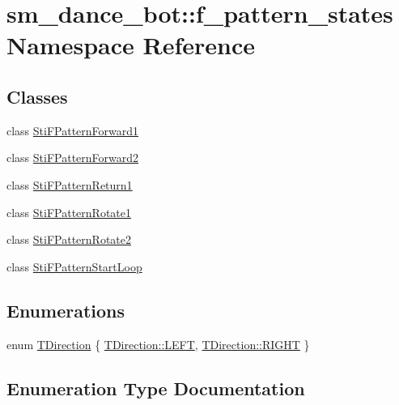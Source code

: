 \hypertarget{namespacesm__dance__bot_1_1f__pattern__states}{}\section{sm\+\_\+dance\+\_\+bot\+:\+:f\+\_\+pattern\+\_\+states Namespace Reference}
\label{namespacesm__dance__bot_1_1f__pattern__states}
\subsection*{Classes}
\begin{DoxyCompactItemize}
\item 
class \hyperlink{structsm__dance__bot_1_1f__pattern__states_1_1StiFPatternForward1}{Sti\+F\+Pattern\+Forward1}
\item 
class \hyperlink{structsm__dance__bot_1_1f__pattern__states_1_1StiFPatternForward2}{Sti\+F\+Pattern\+Forward2}
\item 
class \hyperlink{structsm__dance__bot_1_1f__pattern__states_1_1StiFPatternReturn1}{Sti\+F\+Pattern\+Return1}
\item 
class \hyperlink{structsm__dance__bot_1_1f__pattern__states_1_1StiFPatternRotate1}{Sti\+F\+Pattern\+Rotate1}
\item 
class \hyperlink{structsm__dance__bot_1_1f__pattern__states_1_1StiFPatternRotate2}{Sti\+F\+Pattern\+Rotate2}
\item 
class \hyperlink{structsm__dance__bot_1_1f__pattern__states_1_1StiFPatternStartLoop}{Sti\+F\+Pattern\+Start\+Loop}
\end{DoxyCompactItemize}
\subsection*{Enumerations}
\begin{DoxyCompactItemize}
\item 
enum \hyperlink{namespacesm__dance__bot_1_1f__pattern__states_acc99b72745466e5dcee9272425a34e58}{T\+Direction} \{ \hyperlink{namespacesm__dance__bot_1_1f__pattern__states_acc99b72745466e5dcee9272425a34e58a684d325a7303f52e64011467ff5c5758}{T\+Direction\+::\+L\+E\+FT}, 
\hyperlink{namespacesm__dance__bot_1_1f__pattern__states_acc99b72745466e5dcee9272425a34e58a21507b40c80068eda19865706fdc2403}{T\+Direction\+::\+R\+I\+G\+HT}
 \}
\end{DoxyCompactItemize}


\subsection{Enumeration Type Documentation}

